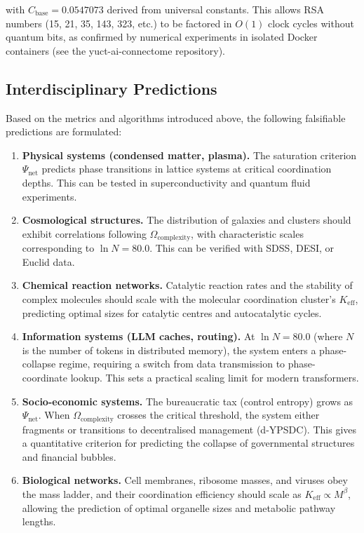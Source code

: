 \documentclass[12pt,a4paper]{article}
\theoremstyle{remark}
\newcommand{\Keff}{K_{\mathrm{eff}}}
\begin{document}
	with \(C_{\text{base}} = 0.0547073\) derived from universal constants. This allows RSA numbers (15, 21, 35, 143, 323, etc.) to be factored in \(O(1)\) clock cycles without quantum bits, as confirmed by numerical experiments in isolated Docker containers (see the yuct-ai-connectome repository).
	
	\subsection{Interdisciplinary Predictions}
	\label{subsec:predictions-complexity}
	
	Based on the metrics and algorithms introduced above, the following falsifiable predictions are formulated:
	
	\begin{enumerate}[label=(\arabic*)]
		\item \textbf{Physical systems (condensed matter, plasma).} The saturation criterion \(\Psi_{\mathrm{net}}\) predicts phase transitions in lattice systems at critical coordination depths. This can be tested in superconductivity and quantum fluid experiments.
		\item \textbf{Cosmological structures.} The distribution of galaxies and clusters should exhibit correlations following \(\Omega_{\mathrm{complexity}}\), with characteristic scales corresponding to \(\ln N = 80.0\). This can be verified with SDSS, DESI, or Euclid data.
		\item \textbf{Chemical reaction networks.} Catalytic reaction rates and the stability of complex molecules should scale with the molecular coordination cluster's \(\Keff\), predicting optimal sizes for catalytic centres and autocatalytic cycles.
		\item \textbf{Information systems (LLM caches, routing).} At \(\ln N = 80.0\) (where \(N\) is the number of tokens in distributed memory), the system enters a phase-collapse regime, requiring a switch from data transmission to phase-coordinate lookup. This sets a practical scaling limit for modern transformers.
		\item \textbf{Socio-economic systems.} The bureaucratic tax (control entropy) grows as \(\Psi_{\mathrm{net}}\). When \(\Omega_{\mathrm{complexity}}\) crosses the critical threshold, the system either fragments or transitions to decentralised management (d-YPSDC). This gives a quantitative criterion for predicting the collapse of governmental structures and financial bubbles.
		\item \textbf{Biological networks.} Cell membranes, ribosome masses, and viruses obey the mass ladder, and their coordination efficiency should scale as \(\Keff \propto M^{\beta}\), allowing the prediction of optimal organelle sizes and metabolic pathway lengths.
	\end{enumerate}
	
\end{document}
